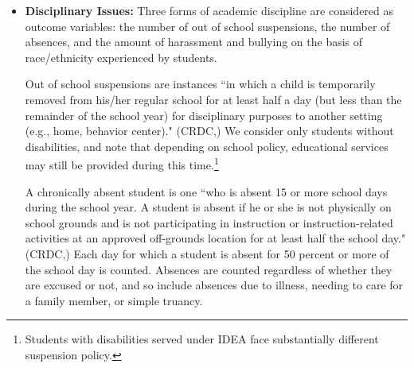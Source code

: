 \documentclass[11pt]{article}
\begin{document}
\begin{itemize}
LEP students (also called English Learner students) are students that, as a result of their limited command over the English language, have difficulty participating in regular school activities.\footnote{The specific definition of a LEP student depends on individual state regulation, but must also satisfy the criteria outlined under Title IX of the Elementary and Secondary Education Act (US Department of Education,\cite{noauthor_elementary_2004}). The most salient features of Title IX are that students must either not speak English as a native language or come from an environment where non-English languages are dominant, and also face substantial difficulty in engaging with others on the basis of their English ability.} 9\% of all public school students are considered LEP, and while students are placed into the program is at the discretion of individual school districts, all districts must provide language assistance services and have staff qualified to implement the LEP programs.\footnote{ Department of Justice and Department of Education,\cite{noauthor_ensuring_2015} contains a full enumeration of the responsibilities school districts have. It further includes requirements such as ensuring equal access to various school programs etc. } 

\item \textbf{Disciplinary Issues:} Three forms of academic discipline are considered as outcome variables: the number of out of school suspensions, the number of absences, and the amount of harassment and bullying on the basis of race/ethnicity experienced by students.

Out of school suspensions are instances ``in which a child is temporarily removed from his/her regular school for at least half a day (but less than the remainder of the school year) for disciplinary purposes to another setting (e.g., home, behavior center)." (CRDC,\cite{noauthor_master_2016}) We consider only students without disabilities, and note that depending on school policy, educational services may still be provided during this time.\footnote{Students with disabilities served under IDEA face substantially different suspension policy.}

A chronically absent student is one ``who is absent 15 or more school days during the school year. A student is absent if he or she is not physically on school grounds and is not participating in instruction or instruction-related activities at an approved off-grounds location for at least half the school day." (CRDC,\cite{noauthor_master_2016}) Each day for which a student is absent for 50 percent or more of the school day is counted. Absences are counted regardless of whether they are excused or not, and so include absences due to illness, needing to care for a family member, or simple truancy.


\end{itemize}
\end{document}
